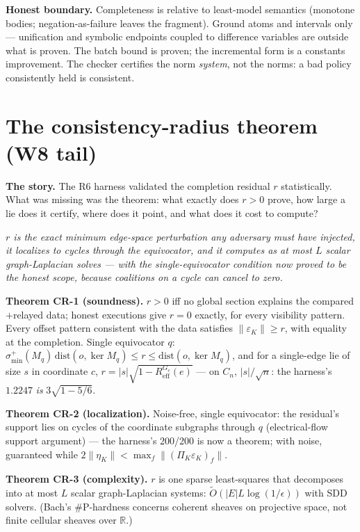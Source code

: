 \documentclass[11pt,a4paper]{article}
\newcommand{\onebreath}[1]{\begin{center}\emph{#1}\end{center}}
\begin{document}
\begin{boundary}
\textbf{Honest boundary.} Completeness is relative to least-model semantics (monotone bodies; negation-as-failure leaves the fragment). Ground atoms and intervals only --- unification and symbolic endpoints coupled to difference variables are outside what is proven. The batch bound is proven; the incremental form is a constants improvement. The checker certifies the norm \emph{system}, not the norms: a bad policy consistently held is consistent.
\end{boundary}

\section{The consistency-radius theorem (W8 tail)}\label{sec:cr}
\textbf{The story.} The R6 harness validated the completion residual $r$ statistically. What was missing was the theorem: what exactly does $r > 0$ prove, how large a lie does it certify, where does it point, and what does it cost to compute?

\onebreath{$r$ is the exact minimum edge-space perturbation any adversary must have injected, it localizes to cycles through the equivocator, and it computes as at most $L$ scalar graph-Laplacian solves --- with the single-equivocator condition now proved to be the honest scope, because coalitions on a cycle can cancel to zero.}

\begin{thebox}
\textbf{Theorem CR-1 (soundness).} $r > 0$ iff no global section explains the compared$+$relayed data; honest executions give $r=0$ exactly, for every visibility pattern. Every offset pattern consistent with the data satisfies $\|\varepsilon_K\| \ge r$, with equality at the completion. Single equivocator $q$: $\sigma^{+}_{\min}(M_q)\,\mathrm{dist}(o, \ker M_q) \le r \le \mathrm{dist}(o, \ker M_q)$, and for a single-edge lie of size $s$ in coordinate $c$, $r = |s|\sqrt{1 - R^{G_c}_{\mathrm{eff}}(e)}$ --- on $C_n$, $|s|/\sqrt{n}$: the harness's $1.2247$ \emph{is} $3\sqrt{1-5/6}$.

\textbf{Theorem CR-2 (localization).} Noise-free, single equivocator: the residual's support lies on cycles of the coordinate subgraphs through $q$ (electrical-flow support argument) --- the harness's 200/200 is now a theorem; with noise, guaranteed while $2\|\eta_K\| < \max_f \|(\Pi_K \varepsilon_K)_f\|$.

\textbf{Theorem CR-3 (complexity).} $r$ is one sparse least-squares that decomposes into at most $L$ scalar graph-Laplacian systems: $\widetilde{O}(|E| L \log(1/\epsilon))$ with SDD solvers. (Bach's \#P-hardness concerns coherent sheaves on projective space, not finite cellular sheaves over $\mathbb{R}$.)
\end{thebox}
\end{document}

